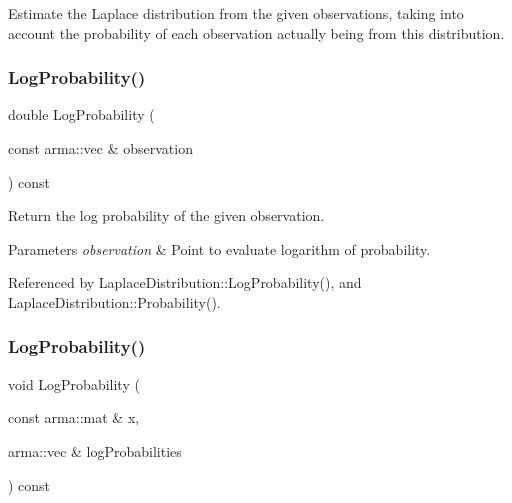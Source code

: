 Estimate the Laplace distribution from the given observations, taking into account the probability of each observation actually being from this distribution. 

\mbox{\label{classmlpack_1_1distribution_1_1LaplaceDistribution_a7063c1fb92f512f32bf44542c7528739}} 
\subsubsection{Log\+Probability()\hspace{0.1cm}{\footnotesize\ttfamily [1/2]}}
{\footnotesize\ttfamily double Log\+Probability (\begin{DoxyParamCaption}\item[{const arma\+::vec \&}]{observation }\end{DoxyParamCaption}) const}



Return the log probability of the given observation. 


\begin{DoxyParams}{Parameters}
{\em observation} & Point to evaluate logarithm of probability. \\
\hline
\end{DoxyParams}


Referenced by Laplace\+Distribution\+::\+Log\+Probability(), and Laplace\+Distribution\+::\+Probability().

\mbox{\label{classmlpack_1_1distribution_1_1LaplaceDistribution_aabd4dbf56bd3d719aede447516d68296}} 
\subsubsection{Log\+Probability()\hspace{0.1cm}{\footnotesize\ttfamily [2/2]}}
{\footnotesize\ttfamily void Log\+Probability (\begin{DoxyParamCaption}\item[{const arma\+::mat \&}]{x,  }\item[{arma\+::vec \&}]{log\+Probabilities }\end{DoxyParamCaption}) const\hspace{0.3cm}{\ttfamily [inline]}}



